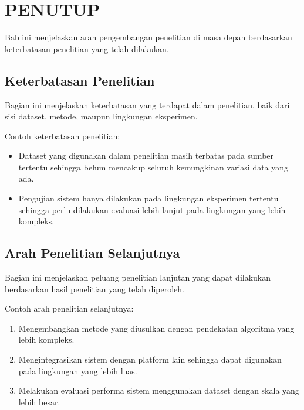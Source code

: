 \chapter{PENUTUP}

Bab ini menjelaskan arah pengembangan penelitian di masa depan
berdasarkan keterbatasan penelitian yang telah dilakukan.

\section{Keterbatasan Penelitian}

Bagian ini menjelaskan keterbatasan yang terdapat dalam penelitian,
baik dari sisi dataset, metode, maupun lingkungan eksperimen.

Contoh keterbatasan penelitian:

\begin{itemize}

\item Dataset yang digunakan dalam penelitian masih terbatas pada
sumber tertentu sehingga belum mencakup seluruh kemungkinan
variasi data yang ada.

\item Pengujian sistem hanya dilakukan pada lingkungan eksperimen
tertentu sehingga perlu dilakukan evaluasi lebih lanjut pada
lingkungan yang lebih kompleks.

\end{itemize}

\section{Arah Penelitian Selanjutnya}

Bagian ini menjelaskan peluang penelitian lanjutan yang dapat dilakukan
berdasarkan hasil penelitian yang telah diperoleh.

Contoh arah penelitian selanjutnya:

\begin{enumerate}

\item Mengembangkan metode yang diusulkan dengan pendekatan algoritma
yang lebih kompleks.

\item Mengintegrasikan sistem dengan platform lain sehingga dapat
digunakan pada lingkungan yang lebih luas.

\item Melakukan evaluasi performa sistem menggunakan dataset dengan
skala yang lebih besar.

\end{enumerate}